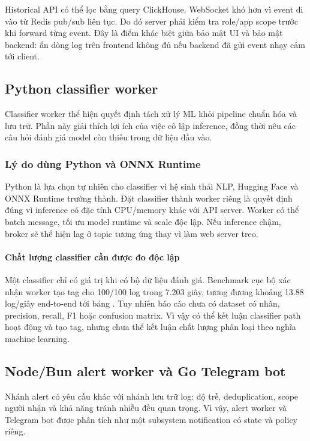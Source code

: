 Historical API có thể lọc bằng query ClickHouse. WebSocket khó hơn vì event đi vào từ Redis pub/sub liên tục. Do đó server phải kiểm tra role/app scope trước khi forward từng event. Đây là điểm khác biệt giữa bảo mật UI và bảo mật backend: ẩn dòng log trên frontend không đủ nếu backend đã gửi event nhạy cảm tới client.

\subsection{Python classifier worker}

Classifier worker thể hiện quyết định tách xử lý ML khỏi pipeline chuẩn hóa và lưu trữ. Phần này giải thích lợi ích của việc cô lập inference, đồng thời nêu các câu hỏi đánh giá model còn thiếu trong dữ liệu đầu vào.

\subsubsection{Lý do dùng Python và ONNX Runtime}

Python là lựa chọn tự nhiên cho classifier vì hệ sinh thái NLP, Hugging Face và ONNX Runtime trưởng thành. Đặt classifier thành worker riêng là quyết định đúng vì inference có đặc tính CPU/memory khác với API server. Worker có thể batch message, tối ưu model runtime và scale độc lập. Nếu inference chậm, broker sẽ thể hiện lag ở topic tương ứng thay vì làm web server treo.

\paragraph{Chất lượng classifier cần được đo độc lập}

Một classifier chỉ có giá trị khi có bộ dữ liệu đánh giá. Benchmark cục bộ xác nhận worker tạo tag cho 100/100 log trong 7.203 giây, tương đương khoảng 13.88 log/giây end-to-end tới bảng . Tuy nhiên báo cáo chưa có dataset có nhãn, precision, recall, F1 hoặc confusion matrix. Vì vậy có thể kết luận classifier path hoạt động và tạo tag, nhưng chưa thể kết luận chất lượng phân loại theo nghĩa machine learning.

\subsection{Node/Bun alert worker và Go Telegram bot}

Nhánh alert có yêu cầu khác với nhánh lưu trữ log: độ trễ, deduplication, scope người nhận và khả năng tránh nhiễu đều quan trọng. Vì vậy, alert worker và Telegram bot được phân tích như một subsystem notification có state và policy riêng.

